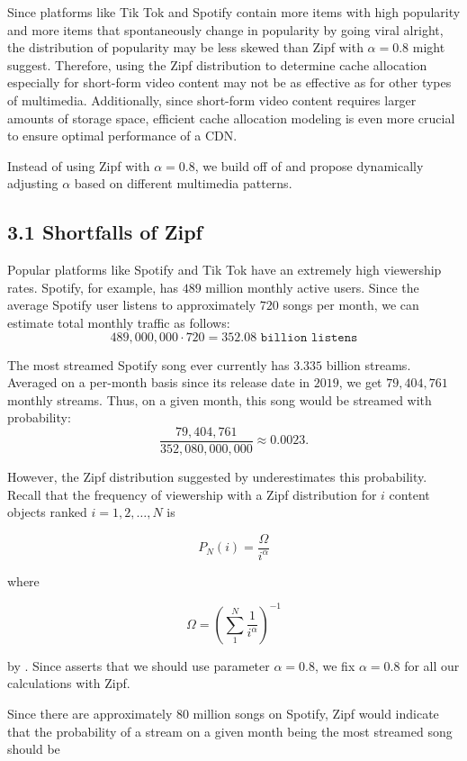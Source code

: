 \documentclass[
	a4paper, %
	10pt, %
	unnumberedsections, %
	twoside, %
]{LTJournalArticle}
\begin{document}
Since platforms like Tik Tok and Spotify contain more items with high popularity and more items that spontaneously change in popularity by going viral alright, the distribution of popularity may be less skewed than Zipf with $\alpha = 0.8$ might suggest. Therefore, using the Zipf distribution to determine cache allocation especially for short-form video content may not be as effective as for other types of multimedia. Additionally, since short-form video content requires larger amounts of storage space, efficient cache allocation modeling is even more crucial to ensure optimal performance of a CDN. 

Instead of using Zipf with $\alpha = 0.8$, we build off of \cite{osmanthesis} and propose dynamically adjusting $\alpha$ based on different multimedia patterns. 

\subsection{3.1 Shortfalls of Zipf}

Popular platforms like Spotify and Tik Tok have an extremely high viewership rates. Spotify, for example, has $489$ million monthly active users. Since the average Spotify user listens to approximately $720$ songs per month, we can estimate total monthly traffic as follows: 
\[
	489,000,000 \cdot 720 = 352.08 \texttt{ billion listens}
\]  
	
The most streamed Spotify song ever currently has $3.335$ billion streams. Averaged on a per-month basis since its release date in $2019$, we get $79,404,761$ monthly streams. Thus, on a given month, this song would be streamed with probability: 
\[
	\frac{79,404,761}{352,080,000,000} \approx 0.0023.
\] 

However, the Zipf distribution suggested by \cite{biancoCDNs2017} underestimates this probability. Recall that the frequency of viewership with a Zipf distribution for $i$ content objects ranked $i = 1, 2, \ldots, N$ is

\[
	P_N(i) = \frac{\Omega}{i^{\alpha}}
\] 

where 

\[
	\Omega = \left(\sum_{1}^{N} \frac{1}{i^{\alpha}}\right)^{-1}
\] 

by \cite{749260}. Since \cite{biancoCDNs2017} asserts that we should use parameter $\alpha = 0.8$, we fix $\alpha = 0.8$ for all our calculations with Zipf. 

Since there are approximately $80$ million songs on Spotify, Zipf would indicate that the probability of a stream on a given month being the most streamed song should be 
\end{document}
